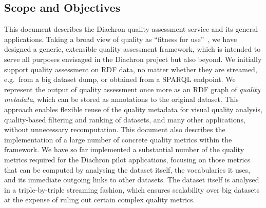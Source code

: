 
\subsection{Scope and Objectives}
\label{sec:ScopeAndObjectives} 

This document describes the Diachron quality assessment service and its general applications.
Taking a broad view of quality as ``fitness for use''~\cite{Juran1974:biblatex}, we have designed a generic, extensible quality assessment framework, which is intended to serve all purposes envisaged in the Diachron project but also beyond.
We initially support quality assessment on RDF data, no matter whether they are streamed, e.g.\ from a big dataset dump, or obtained from a SPARQL endpoint.
We represent the output of quality assessment once more as an RDF graph of \emph{quality metadata}, which can be stored as annotations to the original dataset.
This approach enables flexible reuse of the quality metadata for visual quality analysis, quality-based filtering and ranking of datasets, and many other applications, without unnecessary recomputation.
This document also describes the implementation of a large number of concrete quality metrics within the framework.
We have so far implemented a substantial number of the quality metrics required for the Diachron pilot applications, focusing on those metrics that can be computed by analysing the dataset itself, the vocabularies it uses, and its immediate outgoing links to other datasets.
The dataset itself is analysed in a triple-by-triple streaming fashion, which ensures scalability over big datasets at the expense of ruling out certain complex quality metrics.
